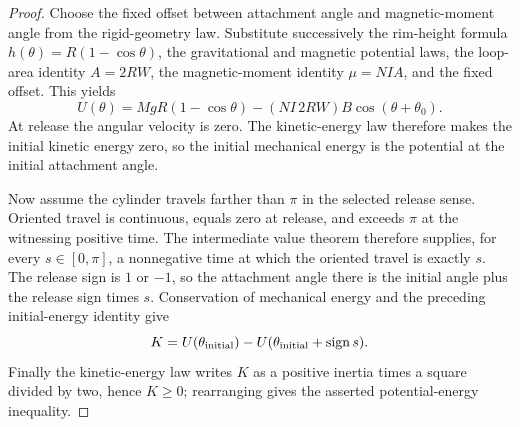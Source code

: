 \begin{proof}
Choose the fixed offset between attachment angle and magnetic-moment angle
from the rigid-geometry law.  Substitute successively the rim-height formula
\(h(\theta)=R(1-\cos\theta)\), the gravitational and magnetic potential laws,
the loop-area identity \(A=2RW\), the magnetic-moment identity
\(\mu=NIA\), and the fixed offset.  This yields
\[
 U(\theta)=MgR(1-\cos\theta)
   -(NI\,2RW)B\cos(\theta+\theta_0).
\]
At release the angular velocity is zero.  The kinetic-energy law therefore
makes the initial kinetic energy zero, so the initial mechanical energy is
the potential at the initial attachment angle.

Now assume the cylinder travels farther than \(\pi\) in the selected release
sense.  Oriented travel is continuous, equals zero at release, and exceeds
\(\pi\) at the witnessing positive time.  The intermediate value theorem
therefore supplies, for every \(s\in[0,\pi]\), a nonnegative time at which the
oriented travel is exactly \(s\).  The release sign is \(1\) or \(-1\), so
the attachment angle there is the initial angle plus the release sign times
\(s\).  Conservation of mechanical energy and the preceding initial-energy
identity give
\[
 K=U(\theta_{\rm initial})
   -U(\theta_{\rm initial}+\operatorname{sign}s).
\]
Finally the kinetic-energy law writes \(K\) as a positive inertia times a
square divided by two, hence \(K\geq0\); rearranging gives the asserted
potential-energy inequality.
\end{proof}

